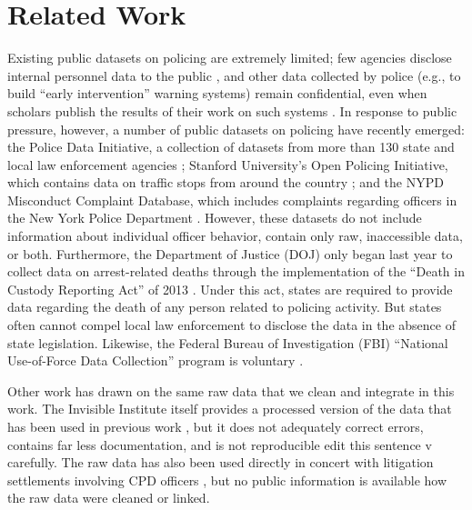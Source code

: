 \section{Related Work}\label{sec:related}
Existing public datasets on policing are extremely limited; 
few agencies disclose internal personnel data to the public \cite{Jackman21},
and other data collected by police (e.g., to build ``early intervention'' warning systems)
remain confidential, even when scholars publish the results of their 
work on such systems \cite{Helsby18}.
In response to public pressure, however, a number of
public datasets on policing have recently emerged: 
the Police Data Initiative, a collection of datasets from 
more than 130 state and local law enforcement agencies \cite{pdi};
Stanford University’s Open Policing Initiative, which contains
data on traffic stops from around the country \cite{sopp}; and
the NYPD Misconduct Complaint Database,
which includes complaints regarding officers in the New York Police Department \cite{nmcd}.
However, these datasets do not include information about individual officer behavior,
contain only raw, inaccessible data, or both.
Furthermore, the Department of Justice
(DOJ) only began last year to collect data on arrest-related deaths through the
implementation of the ``Death in Custody Reporting Act'' of 2013
\cite{DICRA2013}. Under this act, states are required to provide data regarding
the death of any person related to policing activity. But states often cannot compel local
law enforcement to disclose the data in the absence of state legislation.
Likewise, the Federal Bureau of Investigation (FBI) ``National Use-of-Force
Data Collection'' program is voluntary \cite{Gardner2020}.

Other work has drawn on the same raw data that we clean and integrate in this work. 
The Invisible Institute itself provides a processed
version of the data that has been used in previous work \cite{invisdata,ba2021role}, but 
it does not adequately correct errors,
contains far less documentation, and is not reproducible
{\color{red} edit this sentence v carefully}.
The raw data has also been used directly in concert with litigation settlements involving
CPD officers \cite{Rozema19}, but no public information
is available how the raw data were cleaned or linked.
